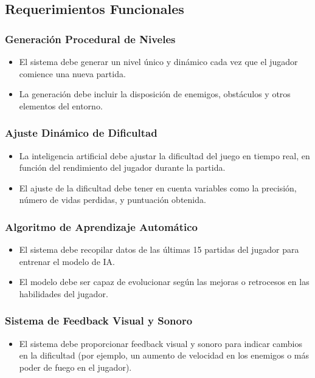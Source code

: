 \subsection{Requerimientos Funcionales}

\subsubsection{Generación Procedural de Niveles}
\begin{itemize}
    \item El sistema debe generar un nivel único y dinámico cada vez que el jugador comience una nueva partida.
    \item La generación debe incluir la disposición de enemigos, obstáculos y otros elementos del entorno.
\end{itemize}

\subsubsection{Ajuste Dinámico de Dificultad}
\begin{itemize}
    \item La inteligencia artificial debe ajustar la dificultad del juego en tiempo real, en función del rendimiento del jugador durante la partida.
    \item El ajuste de la dificultad debe tener en cuenta variables como la precisión, número de vidas perdidas, y puntuación obtenida.
\end{itemize}

\subsubsection{Algoritmo de Aprendizaje Automático}
\begin{itemize}
    \item El sistema debe recopilar datos de las últimas 15 partidas del jugador para entrenar el modelo de IA.
    \item El modelo debe ser capaz de evolucionar según las mejoras o retrocesos en las habilidades del jugador.
\end{itemize}

\subsubsection{Sistema de Feedback Visual y Sonoro}
\begin{itemize}
    \item El sistema debe proporcionar feedback visual y sonoro para indicar cambios en la dificultad (por ejemplo, un aumento de velocidad en los enemigos o más poder de fuego en el jugador).
\end{itemize}

